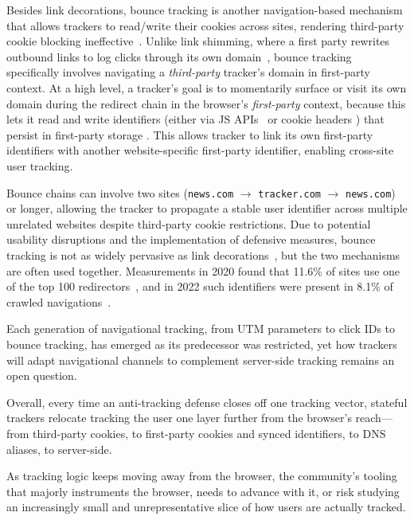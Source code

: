 Besides link decorations, bounce tracking is another navigation-based mechanism that allows trackers to read/write their cookies across sites, rendering third-party cookie blocking ineffective~\cite{kellyBounceTrackingMitigations2022}.
%
Unlike link shimming, where a first party rewrites outbound links to log clicks through its own domain~\cite{liShimShimmenyEvaluating2020}, bounce tracking specifically involves navigating a \emph{third-party} tracker's domain in first-party context.
%
At a high level, a tracker's goal is to momentarily surface or visit its own domain during the redirect chain in the browser's \emph{first-party} context, because this lets it read and write identifiers (either via JS APIs \symExecution\ or cookie headers \symSharing) that persist in first-party storage \symStorage. 
%
This allows tracker to link its own first-party identifiers with another website-specific first-party identifier, enabling cross-site user tracking.

Bounce chains can involve two sites (\texttt{news.com} $\rightarrow$ \texttt{tracker.com} $\rightarrow$ \texttt{news.com}) or longer, allowing the tracker to propagate a stable user identifier across multiple unrelated websites despite third-party cookie restrictions.
%
Due to potential usability disruptions and the implementation of defensive measures, bounce tracking is not as widely pervasive as link decorations~\cite{iqbalKhaleesiBreakerAdvertising2022}, but the two mechanisms are often used together.
%
Measurements in 2020 found that 11.6\% of sites use one of the top 100 redirectors~\cite{koopInDepthEvaluationRedirect2020}, and in 2022 such identifiers were present in 8.1\% of crawled navigations~\cite{randallMeasuringUIDSmuggling2022}.


\begin{opbox}
Each generation of navigational tracking, from UTM parameters to click IDs to bounce tracking, has emerged as its predecessor was restricted, yet how trackers will adapt navigational channels to complement server-side tracking remains an open question.
\end{opbox}


Overall, every time an anti-tracking defense closes off one tracking vector,
stateful trackers relocate tracking the user one layer further from the browser's reach---from third-party cookies, to first-party cookies and synced identifiers, to DNS aliases, to server-side.

\begin{opbox}
As tracking logic keeps moving away from the browser, the community's tooling that majorly instruments the browser, needs to advance with it, or risk studying an increasingly small and unrepresentative slice of how users are actually tracked.
\end{opbox}


